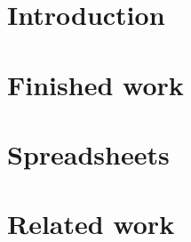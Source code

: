 \documentclass{book}
\begin{document}

\chapter{Introduction}  
\chapter{Finished work} 
\chapter{Spreadsheets}  
\chapter{Related work}  


\end{document}
